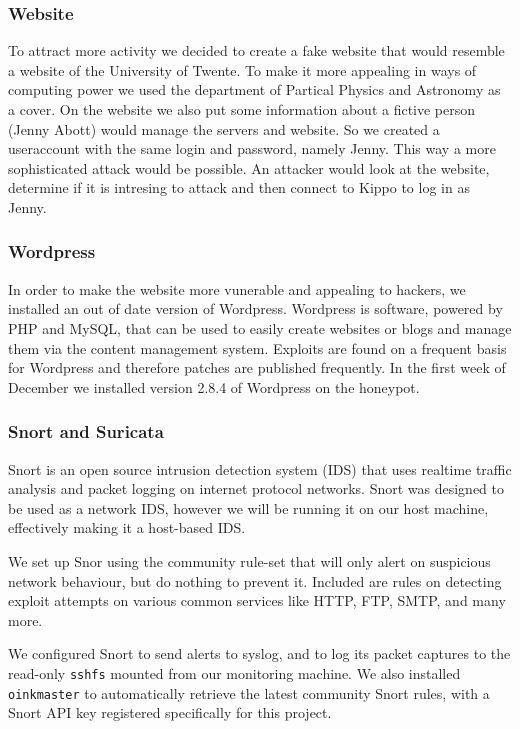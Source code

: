 \documentclass[11pt]{article}
\begin{document}
\subsubsection{Website}
To attract more activity we decided to create a fake website that would resemble a website of the University of Twente. To make it more appealing in ways of computing power we used the department of Partical Physics and Astronomy as a cover.
On the website we also put some information about a fictive person (Jenny Abott) would manage the servers and website. So we created a useraccount with the same login and password, namely Jenny. This way a more sophisticated attack would be possible. An attacker would look at the website, determine if it is intresing to attack and then connect to Kippo to log in as Jenny.

\subsubsection{Wordpress}
In order to make the website more vunerable and appealing to hackers, we installed an out of date version of Wordpress. Wordpress is software, powered by PHP and MySQL, that can be used to easily create websites or blogs and manage them via the content management system. Exploits are found on a frequent basis for Wordpress and therefore patches are published frequently. In the first week of December we installed version 2.8.4 of Wordpress on the honeypot.

\subsubsection{Snort and Suricata}
Snort is an open source intrusion detection system (IDS) that uses realtime traffic analysis and packet logging on internet protocol networks.
Snort was designed to be used as a network IDS, however we will be running it on our host machine, effectively making it a host-based IDS.

We set up Snor using the community rule-set that will only alert on suspicious network behaviour, but do nothing to prevent it. 
Included are rules on detecting exploit attempts on various common services like HTTP, FTP, SMTP, and many more.

We configured Snort to send alerts to syslog, and to log its packet captures to the read-only \verb|sshfs| mounted from our monitoring machine.
We also installed \verb|oinkmaster| to automatically retrieve the latest community Snort rules, with a Snort API key registered specifically for this project.
\end{document}
